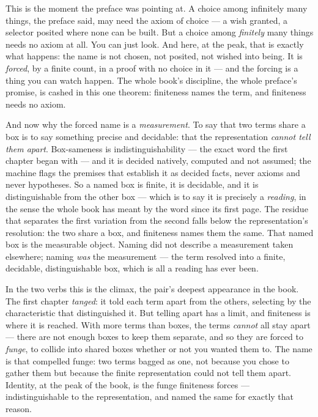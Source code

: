 This is the moment the preface was pointing at. A choice among infinitely many things, the preface said, may need the
axiom of choice --- a wish granted, a selector posited where none can be built. But a choice among \emph{finitely} many
things needs no axiom at all. You can just look. And here, at the peak, that is exactly what happens: the name is not
chosen, not posited, not wished into being. It is \emph{forced}, by a finite count, in a proof with no choice in it ---
and the forcing is a thing you can watch happen. The whole book's discipline, the whole preface's promise, is cashed in
this one theorem: finiteness names the term, and finiteness needs no axiom.

And now why the forced name is a \emph{measurement}. To say that two terms share a box is to say something precise and
decidable: that the representation \emph{cannot tell them apart}. Box-sameness is indistinguishability --- the exact
word the first chapter began with --- and it is decided natively, computed and not assumed; the machine flags the
premises that establish it as decided facts, never axioms and never hypotheses. So a named box is finite, it is
decidable, and it is distinguishable from the other box --- which is to say it is precisely a \emph{reading}, in the
sense the whole book has meant by the word since its first page. The residue that separates the first variation from
the second falls below the representation's resolution: the two share a box, and finiteness names them the same. That
named box is the measurable object. Naming did not describe a measurement taken elsewhere; naming \emph{was} the
measurement --- the term resolved into a finite, decidable, distinguishable box, which is all a reading has ever been.

In the two verbs this is the climax, the pair's deepest appearance in the book. The first chapter \emph{tanged}: it
told each term apart from the others, selecting by the characteristic that distinguished it. But telling apart has a
limit, and finiteness is where it is reached. With more terms than boxes, the terms \emph{cannot} all stay apart ---
there are not enough boxes to keep them separate, and so they are forced to \emph{funge}, to collide into shared boxes
whether or not you wanted them to. The name is that compelled funge: two terms bagged as one, not because you chose to
gather them but because the finite representation could not tell them apart. Identity, at the peak of the book, is the
funge finiteness forces --- indistinguishable to the representation, and named the same for exactly that reason.


